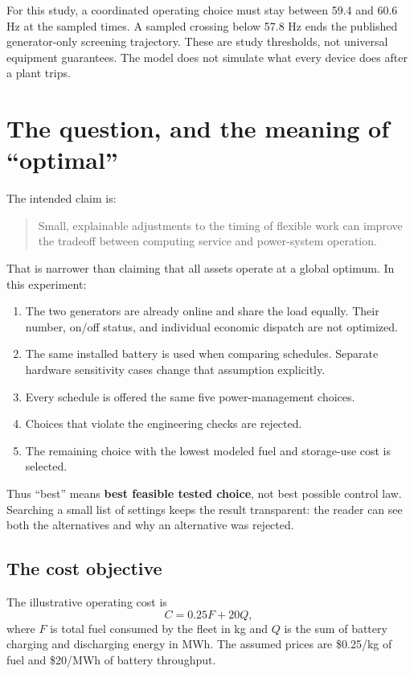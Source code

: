 \documentclass[11pt]{article}
\begin{document}
For this study, a coordinated operating choice must stay between
59.4 and 60.6 Hz at the sampled times. A sampled crossing below
57.8 Hz ends the published generator-only screening trajectory.
These are study thresholds, not universal equipment guarantees.
The model does not simulate what every device does after a plant trips.

\section{The question, and the meaning of ``optimal''}

The intended claim is:
\begin{quote}
Small, explainable adjustments to the timing of flexible work can improve
the tradeoff between computing service and power-system operation.
\end{quote}

That is narrower than claiming that all assets operate at a global optimum.
In this experiment:
\begin{enumerate}
\item The two generators are already online and share the load equally.
Their number, on/off status, and individual economic dispatch are not optimized.
\item The same installed battery is used when comparing schedules.
Separate hardware sensitivity cases change that assumption explicitly.
\item Every schedule is offered the same five power-management choices.
\item Choices that violate the engineering checks are rejected.
\item The remaining choice with the lowest modeled fuel and storage-use
cost is selected.
\end{enumerate}

Thus ``best'' means \textbf{best feasible tested choice}, not best possible
control law. Searching a small list of settings keeps the result transparent:
the reader can see both the alternatives and why an alternative was rejected.

\subsection{The cost objective}

The illustrative operating cost is
\[
C = 0.25 F + 20 Q,
\]
where $F$ is total fuel consumed by the fleet in kg and $Q$ is the sum
of battery charging and discharging energy in MWh. The assumed prices
are \$0.25/kg of fuel and \$20/MWh of battery throughput.
\end{document}
